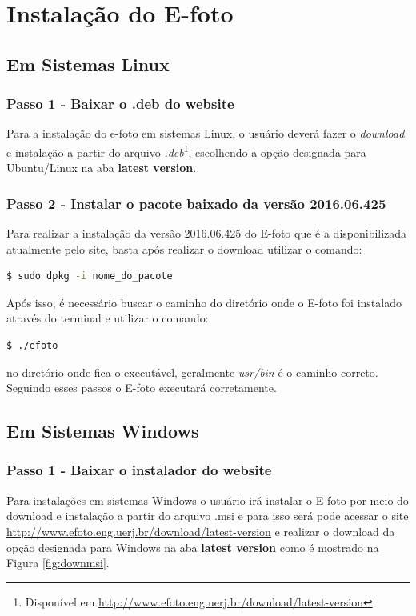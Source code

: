 \section{Instalação do E-foto}

\subsection{Em Sistemas Linux}

\subsubsection{Passo 1 - Baixar o .deb do website}

Para a instalação do e-foto em sistemas Linux, o usuário deverá fazer o \textit{download} e instalação a partir do arquivo \textit{.deb}\footnote{Disponível em  \url{http://www.efoto.eng.uerj.br/download/latest-version}}, escolhendo a opção designada para Ubuntu/Linux na aba \textbf{latest version}.

\subsubsection{Passo 2 - Instalar o pacote baixado da versão 2016.06.425}

Para realizar a instalação da versão 2016.06.425 do E-foto que é a disponibilizada atualmente pelo site,  basta após realizar o download utilizar o comando:

\begin{lstlisting}[language=bash]
	$ sudo dpkg -i nome_do_pacote
\end{lstlisting}

Após isso, é necessário buscar o caminho do diretório onde o E-foto foi instalado através do terminal e utilizar o comando:

\begin{lstlisting}[language=bash]
	$ ./efoto
\end{lstlisting}

no diretório onde fica o executável, geralmente \textit{usr/bin} é o caminho correto. Seguindo esses passos o E-foto executará corretamente.

\subsection{Em Sistemas Windows}

\subsubsection{Passo 1 - Baixar o instalador do website}
Para instalações em sistemas Windows o usuário irá instalar o E-foto por meio do download e instalação a partir do arquivo .msi e para isso será pode acessar o site \url{http://www.efoto.eng.uerj.br/download/latest-version} e realizar o download da opção designada para Windows na aba \textbf{latest version} como é mostrado na Figura \ref{fig:downmsi}.

